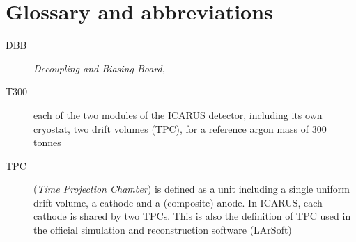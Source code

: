 \section{Glossary and abbreviations}
\label{sec:glossary}

\begin{description}
  \item[DBB] \emph{Decoupling and Biasing Board}, 
  \item[T300] each of the two modules of the ICARUS detector, including its own cryostat, two drift volumes (TPC), for a reference argon mass of 300 tonnes
  \item[TPC] (\emph{Time Projection Chamber}) is defined as a unit including a single uniform drift volume, a cathode and a (composite) anode. In ICARUS, each cathode is shared by two TPCs. This is also the definition of TPC used in the official simulation and reconstruction software (LArSoft)
\end{description}
